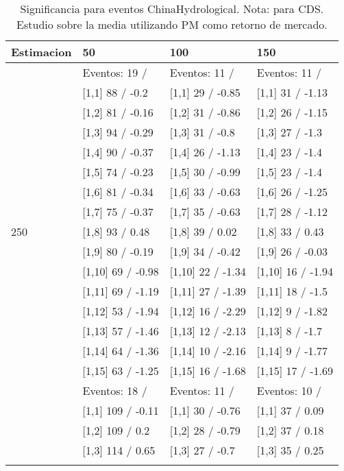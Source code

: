 \begin{table}

\caption{Significancia para eventos ChinaHydrological. Nota: para CDS. Estudio sobre la media utilizando PM como retorno de mercado.}
\centering
\begin{tabular}[t]{llll}
\toprule
Estimacion & 50 & 100 & 150\\
\midrule
 & Eventos:  19 / & Eventos:  11 / & Eventos:  11 /\\
 & {}[1,1] 88  / -0.2 & {}[1,1] 29  / -0.85 & {}[1,1] 31  / -1.13\\
 & {}[1,2] 81  / -0.16 & {}[1,2] 31  / -0.86 & {}[1,2] 26  / -1.15\\
 & {}[1,3] 94  / -0.29 & {}[1,3] 31  / -0.8 & {}[1,3] 27  / -1.3\\
 & {}[1,4] 90  / -0.37 & {}[1,4] 26  / -1.13 & {}[1,4] 23  / -1.4\\
\addlinespace
 & {}[1,5] 74  / -0.23 & {}[1,5] 30  / -0.99 & {}[1,5] 23  / -1.4\\
 & {}[1,6] 81  / -0.34 & {}[1,6] 33  / -0.63 & {}[1,6] 26  / -1.25\\
 & {}[1,7] 75  / -0.37 & {}[1,7] 35  / -0.63 & {}[1,7] 28  / -1.12\\
250 & {}[1,8] 93  / 0.48 & {}[1,8] 39  / 0.02 & {}[1,8] 33  / 0.43\\
 & {}[1,9] 80  / -0.19 & {}[1,9] 34  / -0.42 & {}[1,9] 26  / -0.03\\
\addlinespace
 & {}[1,10] 69  / -0.98 & {}[1,10] 22  / -1.34 & {}[1,10] 16  / -1.94\\
 & {}[1,11] 69  / -1.19 & {}[1,11] 27  / -1.39 & {}[1,11] 18  / -1.5\\
 & {}[1,12] 53  / -1.94 & {}[1,12] 16  / -2.29 & {}[1,12] 9  / -1.82\\
 & {}[1,13] 57  / -1.46 & {}[1,13] 12  / -2.13 & {}[1,13] 8  / -1.7\\
 & {}[1,14] 64  / -1.36 & {}[1,14] 10  / -2.16 & {}[1,14] 9  / -1.77\\
\addlinespace
 & {}[1,15] 63  / -1.25 & {}[1,15] 16  / -1.68 & {}[1,15] 17  / -1.69\\
 & Eventos:  18 / & Eventos:  11 / & Eventos:  10 /\\
 & {}[1,1] 109  / -0.11 & {}[1,1] 30  / -0.76 & {}[1,1] 37  / 0.09\\
 & {}[1,2] 109  / 0.2 & {}[1,2] 28  / -0.79 & {}[1,2] 37  / 0.18\\
 & {}[1,3] 114  / 0.65 & {}[1,3] 27  / -0.7 & {}[1,3] 35  / 0.25\\
\addlinespace

\end{tabular}
\end{table}
